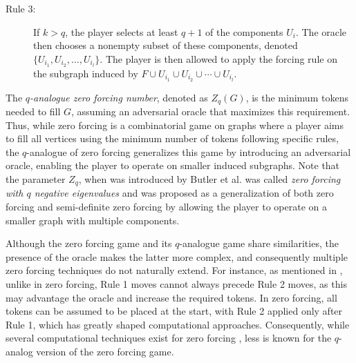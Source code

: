 \documentclass[11pt]{article}
\theoremstyle{plain}
\theoremstyle{definition}
\theoremstyle{remark}
\begin{document}
\begin{description}
    \item[Rule 3:] If $k > q$, the player selects at least $q+1$ of the components $U_i$. The oracle then chooses a nonempty subset of these components, denoted $\{U_{i_1}, U_{i_2}, \dots, U_{i_l}\}$. The player is then allowed to apply the forcing rule on the subgraph induced by $F \cup U_{i_1} \cup U_{i_2} \cup \cdots \cup U_{i_l}$.
\end{description}  

The \emph{$q$-analogue zero forcing number}, denoted as $Z_q(G)$, is the minimum tokens needed to fill $G$, assuming an adversarial oracle that maximizes this requirement.  Thus, while zero forcing is a combinatorial game on graphs where a player aims to fill all vertices using the minimum number of tokens following specific rules, the $q$-analogue of zero forcing generalizes this game by introducing an adversarial oracle, enabling the player to operate on smaller induced subgraphs. Note that the parameter $Z_q$, when was introduced by Butler et al. \cite{butler2015using} was called  \textit{zero forcing with $q$ negative eigenvalues} and was proposed as a generalization of both zero forcing and semi-definite zero forcing by allowing the player to operate on a smaller graph with multiple components.

Although the zero forcing game and its $q$-analogue game share similarities, the presence of the oracle makes the latter more complex, and consequently multiple zero forcing techniques do not naturally extend. For instance, as mentioned in \cite{butler2015using}, unlike in zero forcing, Rule 1 moves cannot always precede Rule 2 moves, as this may advantage the oracle and increase the required tokens. In zero forcing, all tokens can be assumed to be placed at the start, with Rule 2 applied only after Rule 1, which has greatly shaped computational approaches. Consequently, while several computational techniques exist for zero forcing \cite{bbfh2019, bmh2021, aazami2008hardness, A2010}, less is known for the $q$-analog version of the zero forcing game. 
\end{document}

